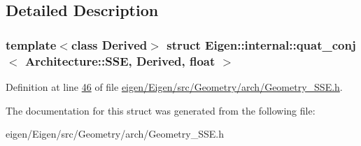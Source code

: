 \subsection{Detailed Description}
\subsubsection*{template$<$class Derived$>$\newline
struct Eigen\+::internal\+::quat\+\_\+conj$<$ Architecture\+::\+S\+S\+E, Derived, float $>$}



Definition at line \hyperlink{eigen_2_eigen_2src_2_geometry_2arch_2_geometry___s_s_e_8h_source_l00046}{46} of file \hyperlink{eigen_2_eigen_2src_2_geometry_2arch_2_geometry___s_s_e_8h_source}{eigen/\+Eigen/src/\+Geometry/arch/\+Geometry\+\_\+\+S\+S\+E.\+h}.



The documentation for this struct was generated from the following file\+:\begin{DoxyCompactItemize}
\item 
eigen/\+Eigen/src/\+Geometry/arch/\+Geometry\+\_\+\+S\+S\+E.\+h\end{DoxyCompactItemize}

